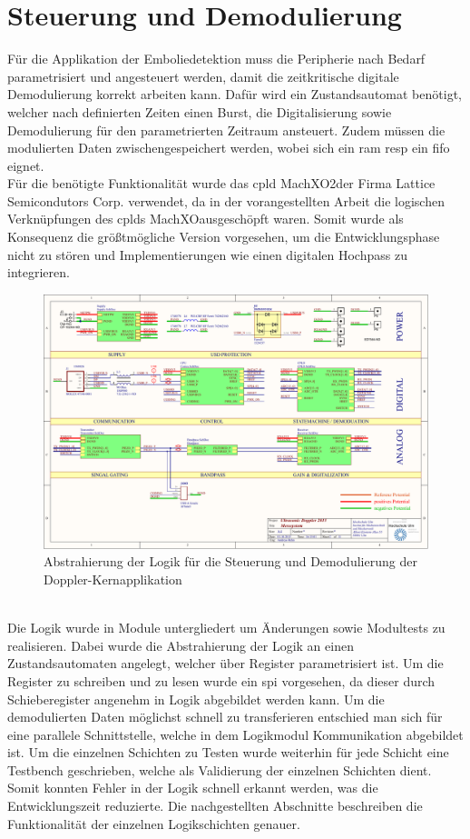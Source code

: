 \section{Steuerung und Demodulierung}
Für die Applikation der Emboliedetektion muss die Peripherie nach Bedarf parametrisiert und angesteuert werden, damit die zeitkritische digitale Demodulierung korrekt arbeiten kann. Dafür wird ein Zustandsautomat benötigt, welcher nach definierten Zeiten einen Burst, die Digitalisierung sowie Demodulierung für den parametrierten Zeitraum ansteuert. Zudem müssen die modulierten Daten zwischengespeichert werden, wobei sich ein \ac{ram} \ac{resp} ein \ac{fifo} eignet.\\
Für die benötigte Funktionalität wurde das \ac{cpld} MachXO2\SymbTM der Firma Lattice Semicondutors Corp. verwendet\cite{machxo2}, da in der vorangestellten Arbeit die logischen Verknüpfungen des \ac{cpld}s MachXO\SymbTM ausgeschöpft waren. Somit wurde als Konsequenz die größtmögliche Version vorgesehen, um die Entwicklungsphase nicht zu stören und Implementierungen wie einen digitalen Hochpass zu integrieren.
\begin{figure}[h!]
	\centering
	\includegraphics[page=11,width=1.0\textwidth, trim=28mm 89mm 38mm 35mm, clip=true]{images/pcb/new.PDF}
	\caption{Abstrahierung der Logik für die Steuerung und Demodulierung der Doppler-Kernapplikation}
	\label{fig:layer_cpld}
\end{figure}\\
Die Logik wurde in Module untergliedert um Änderungen sowie Modultests zu realisieren. Dabei wurde die Abstrahierung der Logik an einen Zustandsautomaten angelegt, welcher über Register parametrisiert ist. Um die Register zu schreiben und zu lesen wurde ein \ac{spi} vorgesehen, da dieser durch Schieberegister angenehm in Logik abgebildet werden kann. Um die demodulierten Daten möglichst schnell zu transferieren entschied man sich für eine parallele Schnittstelle, welche in dem Logikmodul \glqq Kommunikation\grqq{} abgebildet ist. Um die einzelnen Schichten zu Testen wurde weiterhin für jede Schicht eine Testbench geschrieben, welche als Validierung der einzelnen Schichten dient. Somit konnten Fehler in der Logik schnell erkannt werden, was die Entwicklungszeit reduzierte.
Die nachgestellten Abschnitte beschreiben die Funktionalität der einzelnen Logikschichten genauer.
